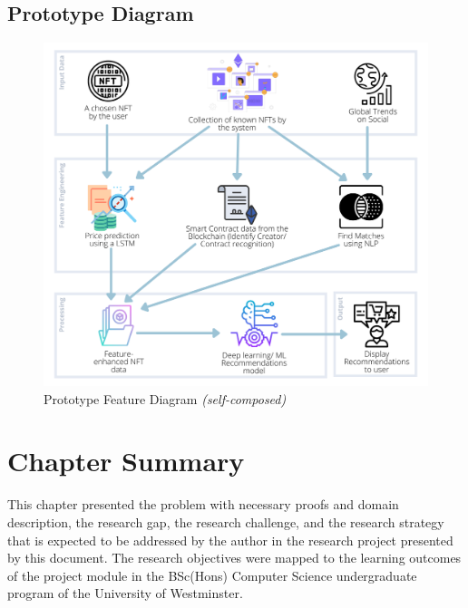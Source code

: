 \subsection{Prototype Diagram}
\vspace{-4mm}
\begin{figure}[ht!]
\centering
\includegraphics[height=0.5\textheight]{images/Protyotype Feature Diagram.png}
\caption{Prototype Feature Diagram \textit{(self-composed)}}
\end{figure}

\vspace{-4mm}
\section{Chapter Summary}
This chapter presented the problem with necessary proofs and domain description, the research gap, the research challenge, and the research strategy that is expected to be addressed by the author in the research project presented by this document. The research objectives were mapped to the learning outcomes of the project module in the BSc(Hons) Computer Science undergraduate program of the University of Westminster.